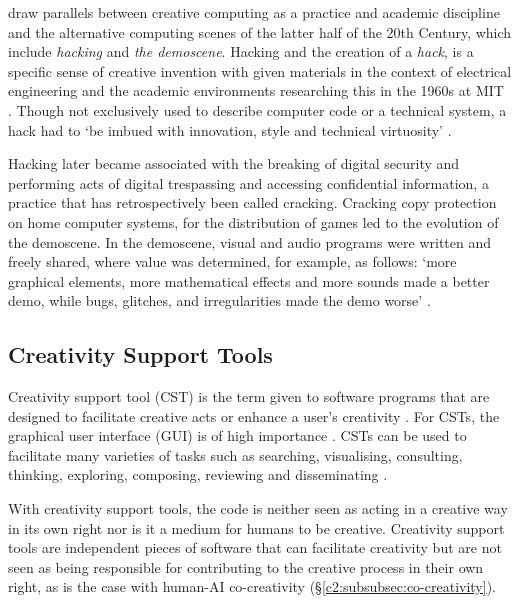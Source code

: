 \cite{clemente2025demoscene} draw parallels between creative computing as a practice and academic discipline and the alternative computing scenes of the latter half of the 20th Century, which include \textit{hacking} and \textit{the demoscene}. 
Hacking and the creation of a \textit{hack}, is a specific sense of creative invention with given materials in the context of electrical engineering and the academic environments researching this in the 1960s at MIT \citep{wark2006hackers}. 
Though not exclusively used to describe computer code or a technical system, a hack had to `be imbued with innovation, style and technical virtuosity' \citep{levy1984hackers}.

Hacking later became associated with the breaking of digital security and performing acts of digital trespassing and accessing confidential information, a practice that has retrospectively been called cracking. 
Cracking copy protection on home computer systems, for the distribution of games led to the evolution of the demoscene. 
In the demoscene, visual and audio programs were written and freely shared, where value was determined, for example, as follows: ‘more graphical elements, more mathematical effects and more sounds made a better demo, while bugs, glitches, and irregularities made the demo worse’ \citep{carlsson2019forgotten}.

\subsection{Creativity Support Tools}
\label{c2:subsec:cst}

Creativity support tool (CST) is the term given to software programs that are designed to facilitate creative acts or enhance a user's creativity \citep{shneiderman2002creativity}. 
For CSTs, the graphical user interface (GUI) is of high importance \citep{shneiderman1999user}. 
CSTs can be used to facilitate many varieties of tasks such as searching, visualising, consulting, thinking, exploring, composing, reviewing and disseminating \citep{shneiderman2002cst_tutorial}.

With creativity support tools, the code is neither seen as acting in a creative way in its own right nor is it a medium for humans to be creative. 
Creativity support tools are independent pieces of software that can facilitate creativity but are not seen as being responsible for contributing to the creative process in their own right, as is the case with human-AI co-creativity (\S \ref{c2:subsubsec:co-creativity}).

